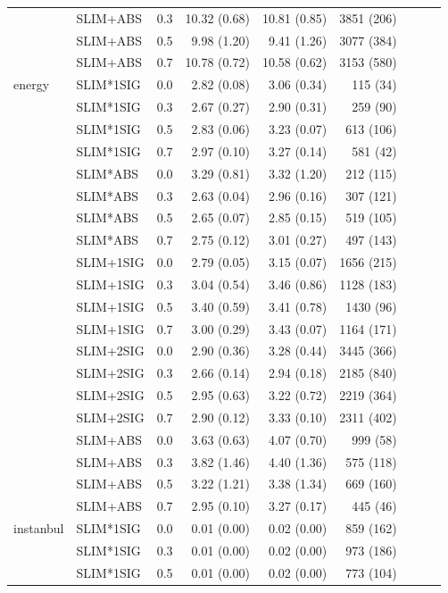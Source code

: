 \begin{longtable}{lllrrrrrr}
 & SLIM+ABS & 0.3 & 10.32 (0.68) & 10.81 (0.85) & 3851 (206) \\
 & SLIM+ABS & 0.5 & 9.98 (1.20) & 9.41 (1.26) & 3077 (384) \\
 & SLIM+ABS & 0.7 & 10.78 (0.72) & 10.58 (0.62) & 3153 (580) \\
\midrule
energy & SLIM*1SIG & 0.0 & 2.82 (0.08) & 3.06 (0.34) & 115 (34) \\
 & SLIM*1SIG & 0.3 & 2.67 (0.27) & 2.90 (0.31) & 259 (90) \\
 & SLIM*1SIG & 0.5 & 2.83 (0.06) & 3.23 (0.07) & 613 (106) \\
 & SLIM*1SIG & 0.7 & 2.97 (0.10) & 3.27 (0.14) & 581 (42) \\
 & SLIM*ABS & 0.0 & 3.29 (0.81) & 3.32 (1.20) & 212 (115) \\
 & SLIM*ABS & 0.3 & 2.63 (0.04) & 2.96 (0.16) & 307 (121) \\
 & SLIM*ABS & 0.5 & 2.65 (0.07) & 2.85 (0.15) & 519 (105) \\
 & SLIM*ABS & 0.7 & 2.75 (0.12) & 3.01 (0.27) & 497 (143) \\
 & SLIM+1SIG & 0.0 & 2.79 (0.05) & 3.15 (0.07) & 1656 (215) \\
 & SLIM+1SIG & 0.3 & 3.04 (0.54) & 3.46 (0.86) & 1128 (183) \\
 & SLIM+1SIG & 0.5 & 3.40 (0.59) & 3.41 (0.78) & 1430 (96) \\
 & SLIM+1SIG & 0.7 & 3.00 (0.29) & 3.43 (0.07) & 1164 (171) \\
 & SLIM+2SIG & 0.0 & 2.90 (0.36) & 3.28 (0.44) & 3445 (366) \\
 & SLIM+2SIG & 0.3 & 2.66 (0.14) & 2.94 (0.18) & 2185 (840) \\
 & SLIM+2SIG & 0.5 & 2.95 (0.63) & 3.22 (0.72) & 2219 (364) \\
 & SLIM+2SIG & 0.7 & 2.90 (0.12) & 3.33 (0.10) & 2311 (402) \\
 & SLIM+ABS & 0.0 & 3.63 (0.63) & 4.07 (0.70) & 999 (58) \\
 & SLIM+ABS & 0.3 & 3.82 (1.46) & 4.40 (1.36) & 575 (118) \\
 & SLIM+ABS & 0.5 & 3.22 (1.21) & 3.38 (1.34) & 669 (160) \\
 & SLIM+ABS & 0.7 & 2.95 (0.10) & 3.27 (0.17) & 445 (46) \\
\midrule
instanbul & SLIM*1SIG & 0.0 & 0.01 (0.00) & 0.02 (0.00) & 859 (162) \\
 & SLIM*1SIG & 0.3 & 0.01 (0.00) & 0.02 (0.00) & 973 (186) \\
 & SLIM*1SIG & 0.5 & 0.01 (0.00) & 0.02 (0.00) & 773 (104) \\

\end{longtable}
